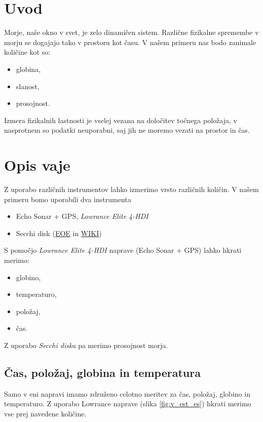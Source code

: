 \documentclass[11pt]{article}
\begin{document}
\section{Uvod}

Morje, naše okno v svet, je zelo dinamičen sistem. Različne fizikalne spremembe v morju se dogajajo tako v prostoru kot času. V našem primeru nas bodo zanimale količine kot so:
\begin{itemize}
	\item globina,
	\item slanost,
	\item prosojnost.
\end{itemize}

\noindent
Izmera fizikalnih lastnosti je vselej vezana na določitev točnega položaja, v nasprotnem so podatki neuporabni, saj jih ne moremo vezati na prostor in čas. 

\section{Opis vaje}
Z uporabo različnih instrumentov lahko izmerimo vrsto različnih količin. V našem primeru bomo uporabili dva instrumenta
\begin{itemize}
	\item Echo Sonar + GPS, \emph{Lowrance Elite 4-HDI}
	\item Secchi disk (\href{http://www.eoearth.org/view/article/155956/}{EOE} in \href{https://en.wikipedia.org/wiki/Secchi_disk}{WIKI})
\end{itemize}

\noindent
S pomočjo \emph{Lowrance Elite 4-HDI} naprave (Echo Sonar + GPS) lahko hkrati merimo:
\begin{itemize}
	\item globino,
	\item temperaturo,
	\item položaj,
	\item čas.
\end{itemize}

\noindent
Z uporabo \emph{Secchi diska} pa merimo prosojnost morja.

\subsection{Čas, položaj, globina in temperatura}
Samo v eni napravi imamo združeno celotno meritev za čas, položaj, globino in temperaturo. Z uporabo Lowrance naprave (slika \ref{fig:v_est_es}) hkrati merimo vse prej navedene količine.
\end{document}
